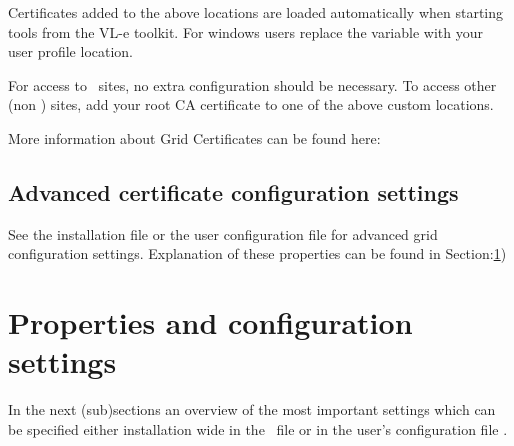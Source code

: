 Certificates added to the above locations are loaded automatically
when starting tools from the VL-e toolkit. 
For windows users replace the  variable with your user profile
location. 

For access to \dutchgrid\ sites, no extra configuration should be necessary. To
access other (non \dutchgrid) sites, add your root CA certificate to one of
the above custom locations. 

More information about Grid Certificates can be found here: \cite{288111}


\subsection{Advanced certificate configuration settings}
See the installation file  or the user
configuration file  for advanced
grid configuration settings. 
Explanation of these properties can be found in Section:\ref{sec:properties})


\section{Properties and configuration settings}
\label{sec:properties}

In the next (sub)sections an overview of the most important settings which can
be specified either installation wide in the \VLETCONF\ file or in the user's
configuration file \VLETUSERCONF. 



